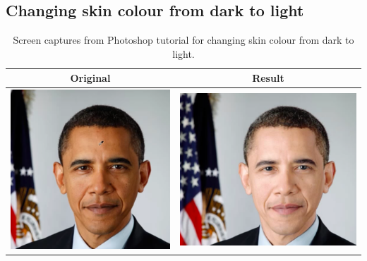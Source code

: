 \subsection{Changing skin colour from dark to light}\label{app:photoshop_obama}
\begin{longtable}{|c|c|}
    \caption{Screen captures from Photoshop tutorial for changing skin colour from dark to light.}\\
    \hline
    Original & Result \\
    \hline
  \begin{minipage}{.29\textwidth}
    \includegraphics[width=\textwidth,height=\textheight,keepaspectratio]{images/obama_orig}
  \end{minipage} & 
  \begin{minipage}{.29\textwidth}
    \includegraphics[width=\textwidth,height=\textheight,keepaspectratio]{images/obama_res}

\end{minipage}
\end{longtable}
